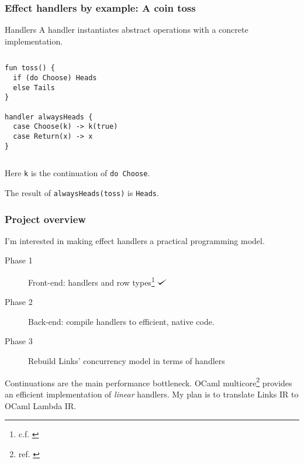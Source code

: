 \documentclass[10pt,compress]{beamer}
\def\checkmark{\tikz\fill[scale=0.4](0,.35) -- (.25,0) -- (1,.7) -- (.25,.15) -- cycle;}
\begin{document}
\begin{frame}[fragile]
  \frametitle{Effect handlers by example: A coin toss}
\begin{block}{Handlers}
A handler instantiates abstract operations with a concrete implementation.
\end{block}
\begin{columns}
\begin{column}{0.5\textwidth}
\begin{lstlisting}
fun toss() {
  if (do Choose) Heads
  else Tails
}

handler alwaysHeads {
  case Choose(k) -> k(true)
  case Return(x) -> x
}
\end{lstlisting}
\end{column}
\begin{column}{0.5\textwidth}
\end{column}
\end{columns}
Here \lstinline$k$ is the continuation of \lstinline$do Choose$.

The result of \lstinline$alwaysHeads(toss)$ is \lstinline$Heads$.
\end{frame}

\begin{frame}
  \frametitle{Project overview}
I'm interested in making effect handlers a practical programming model.
\begin{description}
  \item[Phase 1] Front-end: handlers and row types\footnote{c.f. \citet{Hillerstrom2016}} $\checkmark$
  \item[Phase 2] Back-end: compile handlers to efficient, native code.
  \item[Phase 3] Rebuild Links' concurrency model in terms of handlers
\end{description}
Continuations are the main performance bottleneck.
OCaml multicore\footnote{ref. \citet{Dolan2015}} provides an efficient implementation of \emph{linear} handlers.
My plan is to translate Links IR to OCaml Lambda IR.
\end{frame}
\end{document}
